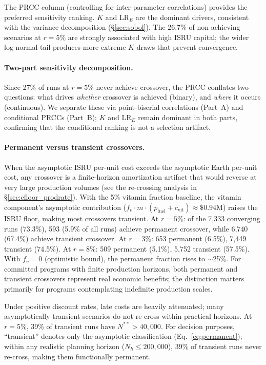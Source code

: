 \documentclass[preprint,12pt]{elsarticle}
\begin{document}
The PRCC column (controlling for inter-parameter correlations) provides the preferred sensitivity ranking. $K$ and LR$_E$ are the dominant drivers, consistent with the variance decomposition (\S\ref{sec:sobol}). The 26.7\% of non-achieving scenarios at $r = 5\%$ are strongly associated with high ISRU capital; the wider log-normal tail produces more extreme $K$ draws that prevent convergence.

\paragraph{Two-part sensitivity decomposition.} Since 27\% of runs at $r = 5\%$ never achieve crossover, the PRCC conflates two questions: what drives \emph{whether} crossover is achieved (binary), and \emph{where} it occurs (continuous). We separate these via point-biserial correlations (Part~A) and conditional PRCCs (Part~B); $K$ and LR$_E$ remain dominant in both parts, confirming that the conditional ranking is not a selection artifact.

\paragraph{Permanent versus transient crossovers.} When the asymptotic ISRU per-unit cost exceeds the asymptotic Earth per-unit cost, any crossover is a finite-horizon amortization artifact that would reverse at very large production volumes (see the re-crossing analysis in \S\ref{sec:cfloor_prodrate}). With the 5\% vitamin fraction baseline, the vitamin component's asymptotic contribution ($f_v \cdot m \cdot (p_{\mathrm{fuel}} + c_{\mathrm{vit}}) \approx \$0.94$M) raises the ISRU floor, making most crossovers transient. At $r = 5\%$: of the 7{,}333 converging runs (73.3\%), 593 (5.9\% of all runs) achieve permanent crossover, while 6{,}740 (67.4\%) achieve transient crossover. At $r = 3\%$: 653 permanent (6.5\%), 7{,}449 transient (74.5\%). At $r = 8\%$: 509 permanent (5.1\%), 5{,}752 transient (57.5\%). With $f_v = 0$ (optimistic bound), the permanent fraction rises to $\sim$25\%. For committed programs with finite production horizons, both permanent and transient crossovers represent real economic benefits; the distinction matters primarily for programs contemplating indefinite production scales.

Under positive discount rates, late costs are heavily attenuated; many asymptotically transient scenarios do not re-cross within practical horizons. At $r = 5\%$, 39\% of transient runs have $N^{**} > 40{,}000$. For decision purposes, ``transient'' denotes only the asymptotic classification (Eq.~\ref{eq:permanent}); within any realistic planning horizon ($N_h \leq 200{,}000$), 39\% of transient runs never re-cross, making them functionally permanent.
\end{document}
